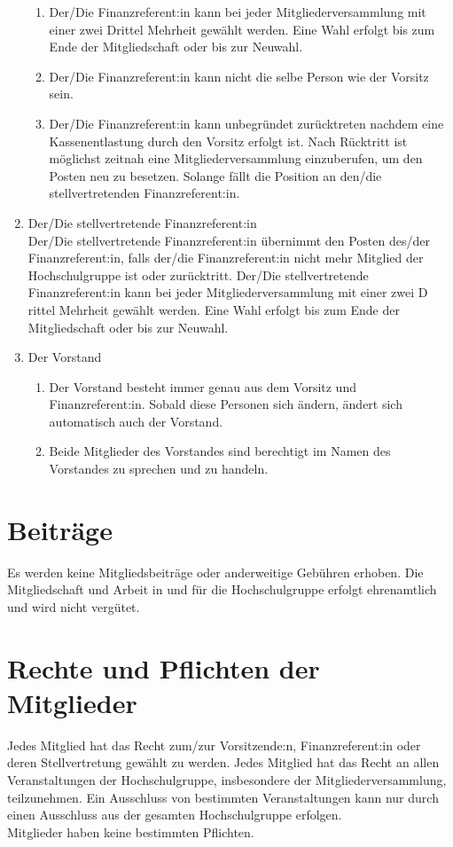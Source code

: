 \documentclass[11pt]{article}
\begin{document}
\begin{enumerate}
\begin{enumerate}
			\item Der/Die Finanzreferent:in kann bei jeder Mitgliederversammlung mit einer zwei Drittel Mehrheit gewählt werden. Eine Wahl erfolgt bis zum Ende der Mitgliedschaft oder bis zur Neuwahl.
			\item Der/Die Finanzreferent:in kann nicht die selbe Person wie der Vorsitz sein.
			\item Der/Die Finanzreferent:in kann unbegründet zurücktreten nachdem eine Kassenentlastung durch den Vorsitz erfolgt ist. Nach Rücktritt ist möglichst zeitnah eine Mitgliederversammlung einzuberufen,  um den Posten neu zu besetzen. Solange fällt die Position an den/die stellvertretenden Finanzreferent:in.
		\end{enumerate}
		\item Der/Die stellvertretende Finanzreferent:in\\
		Der/Die stellvertretende Finanzreferent:in übernimmt den Posten des/der Finanzreferent:in, falls der/die Finanzreferent:in nicht mehr Mitglied der Hochschulgruppe ist oder zurücktritt. Der/Die stellvertretende Finanzreferent:in kann bei jeder Mitgliederversammlung mit einer zwei D
		rittel Mehrheit gewählt werden. Eine Wahl erfolgt bis zum Ende der Mitgliedschaft oder bis zur Neuwahl.
		\item Der Vorstand
		\begin{enumerate}
			\item Der Vorstand besteht immer genau aus dem Vorsitz und Finanzreferent:in. Sobald diese Personen sich ändern, ändert sich automatisch auch der Vorstand.
			\item Beide Mitglieder des Vorstandes sind berechtigt im Namen des Vorstandes zu sprechen und zu handeln.
		\end{enumerate}
	\end{enumerate}
\section{Beiträge}
Es werden keine Mitgliedsbeiträge oder anderweitige Gebühren erhoben. Die Mitgliedschaft und Arbeit in und für die Hochschulgruppe erfolgt ehrenamtlich und wird nicht vergütet.
\section{Rechte und Pflichten der Mitglieder}
Jedes Mitglied hat das Recht zum/zur Vorsitzende:n, Finanzreferent:in oder deren Stellvertretung gewählt zu werden. Jedes Mitglied hat das Recht an allen Veranstaltungen der Hochschulgruppe, insbesondere der Mitgliederversammlung, teilzunehmen. Ein Ausschluss von bestimmten Veranstaltungen kann nur durch einen Ausschluss aus der gesamten Hochschulgruppe erfolgen.\\
Mitglieder haben keine bestimmten Pflichten.
\end{document}
